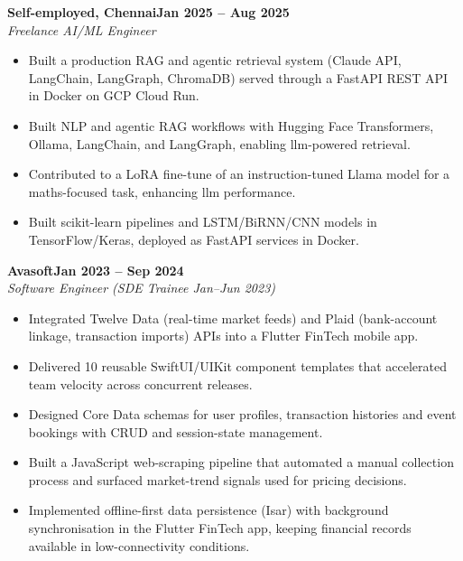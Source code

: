 \documentclass[a4paper,11pt]{article}
\newcommand{\entry}[4]{\needspace{4\baselineskip}\noindent\textbf{#1}\hfill\textbf{#2}\\ \textit{#3}\hfill\textit{#4}\par}
\begin{document}
\vspace{4pt}
\entry{Self-employed, Chennai}{Jan 2025 – Aug 2025}{Freelance AI/ML Engineer}{}
\begin{itemize}
  \item Built a production RAG and agentic retrieval system (Claude API, LangChain, LangGraph, ChromaDB) served through a FastAPI REST API in Docker on GCP Cloud Run.
  \item Built NLP and agentic RAG workflows with Hugging Face Transformers, Ollama, LangChain, and LangGraph, enabling llm-powered retrieval.
  \item Contributed to a LoRA fine-tune of an instruction-tuned Llama model for a maths-focused task, enhancing llm performance.
  \item Built scikit-learn pipelines and LSTM/BiRNN/CNN models in TensorFlow/Keras, deployed as FastAPI services in Docker.
\end{itemize}
\vspace{4pt}
\entry{Avasoft}{Jan 2023 – Sep 2024}{Software Engineer (SDE Trainee Jan–Jun 2023)}{}
\begin{itemize}
  \item Integrated Twelve Data (real-time market feeds) and Plaid (bank-account linkage, transaction imports) APIs into a Flutter FinTech mobile app.
  \item Delivered 10 reusable SwiftUI/UIKit component templates that accelerated team velocity across concurrent releases.
  \item Designed Core Data schemas for user profiles, transaction histories and event bookings with CRUD and session-state management.
  \item Built a JavaScript web-scraping pipeline that automated a manual collection process and surfaced market-trend signals used for pricing decisions.
  \item Implemented offline-first data persistence (Isar) with background synchronisation in the Flutter FinTech app, keeping financial records available in low-connectivity conditions.
\end{itemize}

\end{document}
